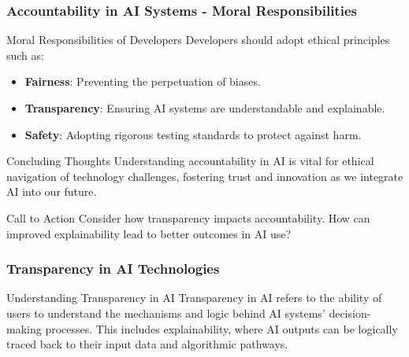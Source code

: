 \documentclass[aspectratio=169]{beamer}
\begin{document}
\begin{frame}[fragile]
    \frametitle{Accountability in AI Systems - Moral Responsibilities}
    \begin{block}{Moral Responsibilities of Developers}
        Developers should adopt ethical principles such as:
        \begin{itemize}
            \item \textbf{Fairness}: Preventing the perpetuation of biases.
            \item \textbf{Transparency}: Ensuring AI systems are understandable and explainable.
            \item \textbf{Safety}: Adopting rigorous testing standards to protect against harm.
        \end{itemize}
    \end{block}

    \begin{block}{Concluding Thoughts}
        Understanding accountability in AI is vital for ethical navigation of technology challenges, 
        fostering trust and innovation as we integrate AI into our future.
    \end{block}

    \begin{block}{Call to Action}
        Consider how transparency impacts accountability. 
        How can improved explainability lead to better outcomes in AI use?
    \end{block}
\end{frame}

\begin{frame}[fragile]
    \frametitle{Transparency in AI Technologies}
    \begin{block}{Understanding Transparency in AI}
        Transparency in AI refers to the ability of users to understand the mechanisms and logic behind AI systems’ decision-making processes. This includes explainability, where AI outputs can be logically traced back to their input data and algorithmic pathways.
    \end{block}
\end{frame}
\end{document}
